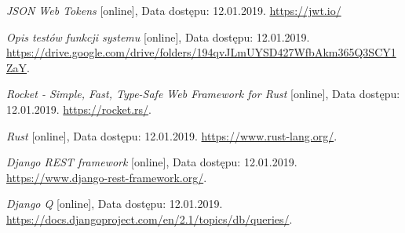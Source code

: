 \documentclass[12pt, notitlepage]{article}
\begin{document}
\begin{thebibliography}{9}

\textit{JSON Web Tokens} [online], Data dostępu: 12.01.2019. 
\newline\url{https://jwt.io/}

\textit{Opis testów funkcji systemu} [online], Data dostępu: 12.01.2019. 
\newline\url{https://drive.google.com/drive/folders/194qvJLmUYSD427WfbAkm365Q3SCY1ZaY}.

\textit{Rocket - Simple, Fast, Type-Safe Web Framework for Rust} [online], Data dostępu: 12.01.2019. 
\newline\url{https://rocket.rs/}.

\textit{Rust} [online], Data dostępu: 12.01.2019. 
\newline\url{https://www.rust-lang.org/}.

\textit{Django REST framework} [online], Data dostępu: 12.01.2019. 
\newline\url{https://www.django-rest-framework.org/}.

\textit{Django Q} [online], Data dostępu: 12.01.2019. 
\newline\url{https://docs.djangoproject.com/en/2.1/topics/db/queries/}.

\end{thebibliography} 
\end{document}
